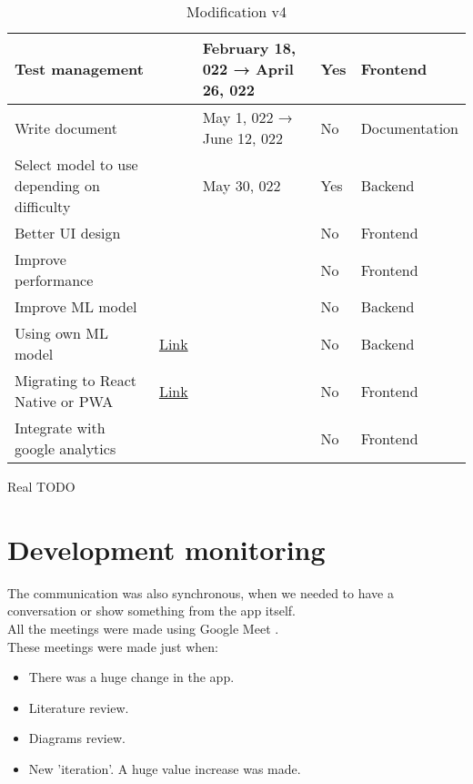 \begin{table}[H]
{\begin{tabular}{|l|l|l|l|l|}
        \hline Test management &  & February 18, 022 → April 26, 022 & Yes & Frontend \\
        \hline Write document &  & May 1, 022 → June 12, 022 & No & Documentation \\
        \hline Select model to use depending on difficulty &  & May 30, 022 & Yes & Backend \\
        \hline Better UI design &  &  & No & Frontend \\
        \hline Improve performance &  &  & No & Frontend \\
        \hline Improve ML model &  &  & No & Backend \\
        \hline Using own ML model & \href{https://github.com/JesusGonzalezA/LearnASL/milestone/10}{Link} &  & No & Backend \\
        \hline Migrating to React Native or PWA & \href{https://github.com/JesusGonzalezA/LearnASL/milestone/9}{Link} &  & No & Frontend \\
        \hline Integrate with google analytics &  &  & No & Frontend \\
        \hline
    \end{tabular}
    }
\caption{Modification v4}
\label{table:planification_real_v4}
\end{table}

Real TODO

\section{Development monitoring}
The communication was also synchronous, when we needed to have a conversation or show something from the app itself. \\

All the meetings were made using Google Meet \cite{GMeet}. \\

These meetings were made just when:
\begin{itemize}
    \item There was a huge change in the app.
    \item Literature review.
    \item Diagrams review.
    \item New 'iteration'. A huge value increase was made.
\end{itemize}

